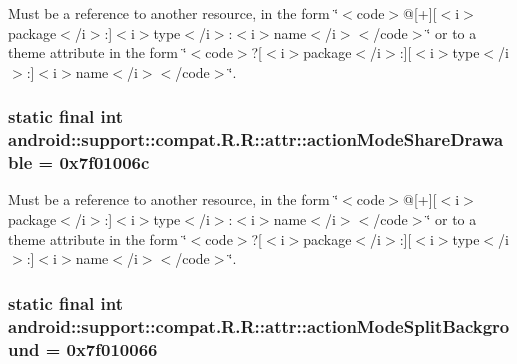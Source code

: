 Must be a reference to another resource, in the form \char`\"{}$<$code$>$@\mbox{[}+\mbox{]}\mbox{[}$<$i$>$package$<$/i$>$:\mbox{]}$<$i$>$type$<$/i$>$:$<$i$>$name$<$/i$>$$<$/code$>$\char`\"{} or to a theme attribute in the form \char`\"{}$<$code$>$?\mbox{[}$<$i$>$package$<$/i$>$:\mbox{]}\mbox{[}$<$i$>$type$<$/i$>$:\mbox{]}$<$i$>$name$<$/i$>$$<$/code$>$\char`\"{}. \hypertarget{classandroid_1_1support_1_1compat_1_1_r_1_1attr_d55bef15e904cb5b3358c0893caf34eb}{
\subsubsection[{actionModeShareDrawable}]{\setlength{\rightskip}{0pt plus 5cm}static final int android::support::compat.R.R::attr::actionModeShareDrawable = 0x7f01006c}}
\label{classandroid_1_1support_1_1compat_1_1_r_1_1attr_d55bef15e904cb5b3358c0893caf34eb}


Must be a reference to another resource, in the form \char`\"{}$<$code$>$@\mbox{[}+\mbox{]}\mbox{[}$<$i$>$package$<$/i$>$:\mbox{]}$<$i$>$type$<$/i$>$:$<$i$>$name$<$/i$>$$<$/code$>$\char`\"{} or to a theme attribute in the form \char`\"{}$<$code$>$?\mbox{[}$<$i$>$package$<$/i$>$:\mbox{]}\mbox{[}$<$i$>$type$<$/i$>$:\mbox{]}$<$i$>$name$<$/i$>$$<$/code$>$\char`\"{}. \hypertarget{classandroid_1_1support_1_1compat_1_1_r_1_1attr_6355927ebafb46897b7d73ea7e3c798a}{
\subsubsection[{actionModeSplitBackground}]{\setlength{\rightskip}{0pt plus 5cm}static final int android::support::compat.R.R::attr::actionModeSplitBackground = 0x7f010066}}
\label{classandroid_1_1support_1_1compat_1_1_r_1_1attr_6355927ebafb46897b7d73ea7e3c798a}


